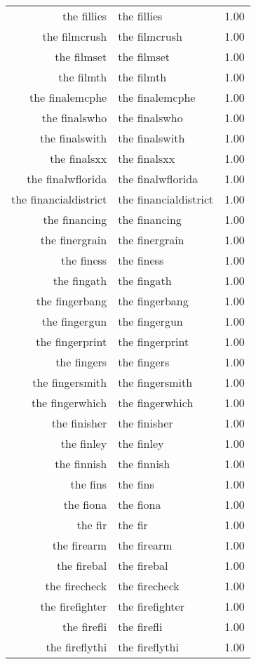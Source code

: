 \begin{table}[ht]
\begin{tabular}{rlr}
  the fillies & the fillies & 1.00 \\ 
  the filmcrush & the filmcrush & 1.00 \\ 
  the filmset & the filmset & 1.00 \\ 
  the filmth & the filmth & 1.00 \\ 
  the finalemcphe & the finalemcphe & 1.00 \\ 
  the finalswho & the finalswho & 1.00 \\ 
  the finalswith & the finalswith & 1.00 \\ 
  the finalsxx & the finalsxx & 1.00 \\ 
  the finalwflorida & the finalwflorida & 1.00 \\ 
  the financialdistrict & the financialdistrict & 1.00 \\ 
  the financing & the financing & 1.00 \\ 
  the finergrain & the finergrain & 1.00 \\ 
  the finess & the finess & 1.00 \\ 
  the fingath & the fingath & 1.00 \\ 
  the fingerbang & the fingerbang & 1.00 \\ 
  the fingergun & the fingergun & 1.00 \\ 
  the fingerprint & the fingerprint & 1.00 \\ 
  the fingers & the fingers & 1.00 \\ 
  the fingersmith & the fingersmith & 1.00 \\ 
  the fingerwhich & the fingerwhich & 1.00 \\ 
  the finisher & the finisher & 1.00 \\ 
  the finley & the finley & 1.00 \\ 
  the finnish & the finnish & 1.00 \\ 
  the fins & the fins & 1.00 \\ 
  the fiona & the fiona & 1.00 \\ 
  the fir & the fir & 1.00 \\ 
  the firearm & the firearm & 1.00 \\ 
  the firebal & the firebal & 1.00 \\ 
  the firecheck & the firecheck & 1.00 \\ 
  the firefighter & the firefighter & 1.00 \\ 
  the firefli & the firefli & 1.00 \\ 
  the fireflythi & the fireflythi & 1.00 \\ 

\end{tabular}
\end{table}
